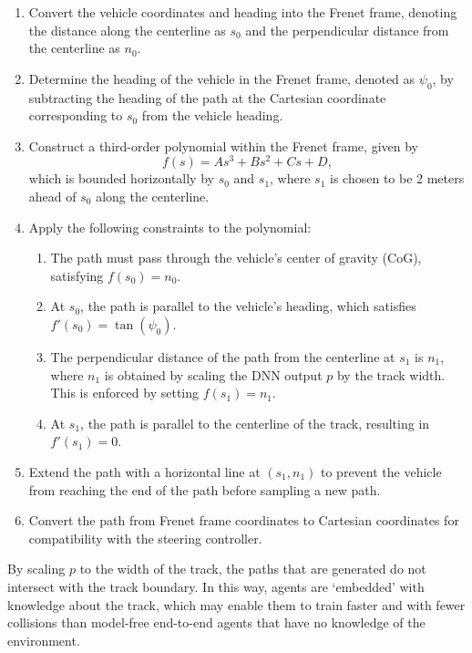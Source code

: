 \begin{enumerate}
    \item Convert the vehicle coordinates and heading into the Frenet frame, denoting the distance along the centerline as $s_0$ and the perpendicular distance from the centerline as $n_0$.
    \item Determine the heading of the vehicle in the Frenet frame, denoted as $\psi_0$, by subtracting the heading of the path at the Cartesian coordinate corresponding to $s_0$ from the vehicle heading.
    \item Construct a third-order polynomial within the Frenet frame, given by
        \begin{equation}
        f(s) = As^3 + Bs^2 + Cs + D,
        \end{equation}
    which is bounded horizontally by $s_0$ and $s_1$, where $s_1$ is chosen to be 2 meters ahead of $s_0$ along the centerline.
    \item Apply the following constraints to the polynomial:
    \begin{enumerate}
        \item The path must pass through the vehicle's center of gravity (CoG), satisfying $f(s_0) = n_0$.
        \item At $s_0$, the path is parallel to the vehicle's heading, which satisfies $f'(s_0) = \tan(\psi_0)$.
        \item The perpendicular distance of the path from the centerline at $s_1$ is $n_1$, where $n_1$ is obtained by scaling the DNN output $p$ by the track width.
        This is enforced by setting $f(s_1) = n_1$.
        \item At $s_1$, the path is parallel to the centerline of the track, resulting in $f'(s_1) = 0$.
    \end{enumerate}
    \item Extend the path with a horizontal line at $(s_1,n_1)$ to prevent the vehicle from reaching the end of the path before sampling a new path.
    \item Convert the path from Frenet frame coordinates to Cartesian coordinates for compatibility with the steering controller.
\end{enumerate}

By scaling $p$ to the width of the track, the paths that are generated do not intersect with the track boundary.
In this way, agents are `embedded' with knowledge about the track, which may enable them to train faster and with fewer collisions 
than model-free end-to-end agents that have no knowledge of the environment.


